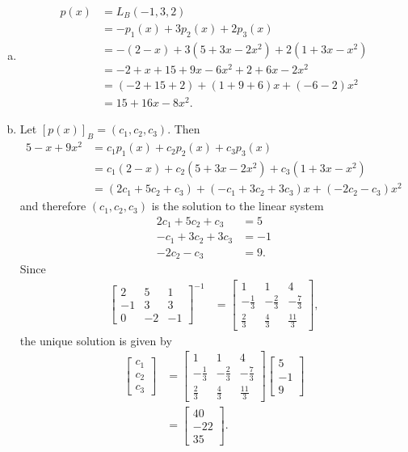 \documentclass[12pt,letterpaper,reqno]{article}
\numberwithin{equation}{section}
\begin{document}
{\color{red}\begin{solution}
	\begin{enumerate}[(a)]
		\item 
		\begin{align*}
			p(x)&=L_B(-1,3,2) \\
			&=-p_1(x)+3p_2(x)+2p_3(x) \\
			&=-(2-x)+3(5+3x-2x^2)+2(1+3x-x^2) \\
			&=-2+x+15+9x-6x^2+2+6x-2x^2 \\
			&=(-2+15+2)+(1+9+6)x+(-6-2)x^2 \\
			&=15+16x-8x^2.
		\end{align*}
	\item Let $[p(x)]_B=(c_1,c_2,c_3)$. Then
	\begin{align*}
		5-x+9x^2&=c_1p_1(x)+c_2p_2(x)+c_3p_3(x) \\
		&=c_1(2-x)+c_2(5+3x-2x^2)+c_3(1+3x-x^2) \\
		&=(2c_1+5c_2+c_3)+(-c_1+3c_2+3c_3)x+(-2c_2-c_3)x^2
	\end{align*}
	and therefore $(c_1,c_2,c_3)$ is the solution to the linear system
	\begin{align*}
		2c_1+5c_2+c_3 &= 5 \\
		-c_1+3c_2+3c_3 & =-1 \\
		-2c_2-c_3 &=9.
	\end{align*}
	Since
	\begin{align*}
		\begin{bmatrix}
			2 & 5 & 1 \\
			-1 & 3 & 3 \\
			0 & -2 & -1 
		\end{bmatrix}^{-1}&=\begin{bmatrix}
			1 & 1 & 4 \\
			-\frac{1}{3} & -\frac{2}{3} & -\frac{7}{3} \\
			\frac{2}{3} & \frac{4}{3} & \frac{11}{3}
		\end{bmatrix},
	\end{align*}
	the unique solution is given by
	\begin{align*}
		\begin{bmatrix}
			c_1 \\ c_2 \\ c_3
		\end{bmatrix}&=\begin{bmatrix}
			1 & 1 & 4 \\
			-\frac{1}{3} & -\frac{2}{3} & -\frac{7}{3} \\
			\frac{2}{3} & \frac{4}{3} & \frac{11}{3}
		\end{bmatrix}\begin{bmatrix}
			5 \\ -1 \\ 9
		\end{bmatrix} \\
		&=\begin{bmatrix}
			40 \\ -22 \\ 35
		\end{bmatrix}.
	\end{align*}
	\end{enumerate}
\end{solution}}
\end{document}
